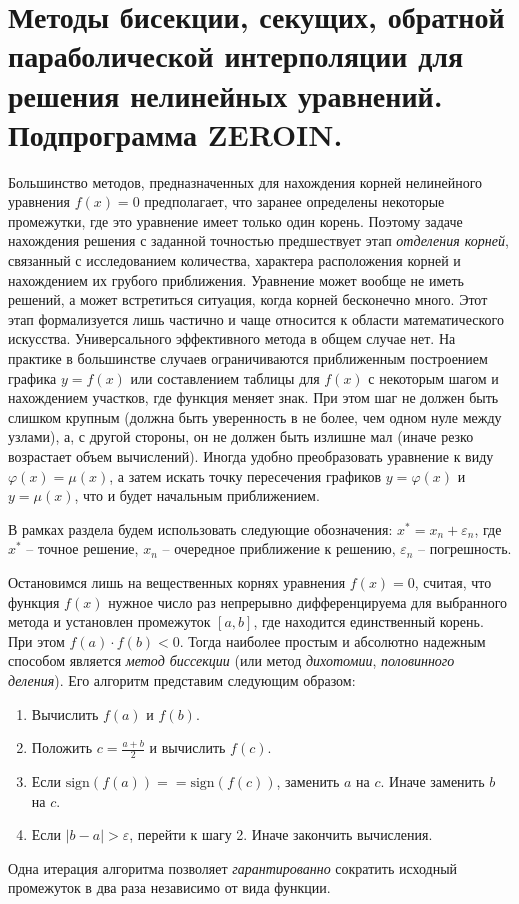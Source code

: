 \section{Методы бисекции, секущих, обратной параболической интерполяции для решения нелинейных уравнений. Подпрограмма \textbf{ZEROIN}.}\label{sec:ch22}
Большинство методов, предназначенных для нахождения корней нелинейного уравнения $f(x) = 0$ предполагает, что
заранее определены некоторые промежутки, где это уравнение имеет только один корень. Поэтому задаче нахождения
решения с заданной точностью предшествует этап \emph{отделения корней}, связанный с исследованием количества,
характера расположения корней и нахождением их грубого приближения. Уравнение может вообще не иметь решений, а может
встретиться ситуация, когда корней бесконечно много. Этот этап формализуется лишь частично и чаще относится к области
математического искусства. Универсального эффективного метода в общем случае нет. На практике в большинстве случаев
ограничиваются приближенным построением графика $y = f(x)$ или составлением таблицы для $f(x)$ с некоторым шагом и
нахождением участков, где функция меняет знак. При этом шаг не должен быть слишком крупным (должна быть уверенность
в не более, чем одном нуле между узлами), а, с другой стороны, он не должен быть излишне мал (иначе резко возрастает
объем вычислений). Иногда удобно преобразовать уравнение к виду $\displaystyle \varphi(x) = \mu(x)$, а затем искать
точку пересечения графиков $y = \varphi(x)$ и $y = \mu(x)$, что и будет начальным приближением.

В рамках раздела будем использовать следующие обозначения: $x^{*} = x_n + \varepsilon_n$, где $x^{*}$ -- точное
решение, $x_n$ -- очередное приближение к решению, $\varepsilon_n$ -- погрешность.

Остановимся лишь на вещественных корнях уравнения $f(x) = 0$, считая, что функция $f(x)$ нужное число раз
непрерывно дифференцируема для выбранного метода и установлен промежуток $[a, b]$, где находится единственный корень.
При этом $\displaystyle f(a) \cdot f(b) < 0$. Тогда наиболее простым и абсолютно надежным способом является
\emph{метод биссекции} (или метод \emph{дихотомии}, \emph{половинного деления}). Его алгоритм представим следующим
образом:
\begin{enumerate}
    \item Вычислить $f(a)$ и $f(b)$.
    \item Положить $\displaystyle c = \frac{a + b}{2}$ и вычислить $f(c)$.
    \item Если $\text{sign}\left( f(a) \right) == \text{sign}\left( f(c) \right)$, заменить $a$ на $c$. Иначе заменить $b$ на $c$.
    \item Если $\displaystyle |b - a| > \varepsilon$, перейти к шагу 2. Иначе закончить вычисления.
\end{enumerate}
Одна итерация алгоритма позволяет \emph{гарантированно} сократить исходный промежуток в два раза независимо от вида
функции.


